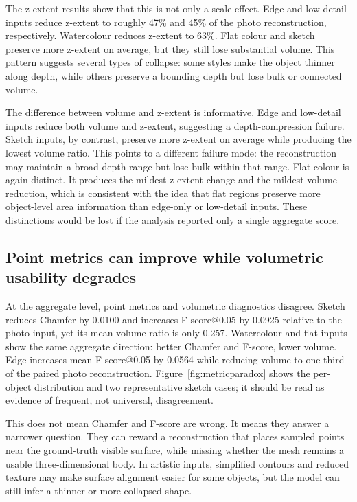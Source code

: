 \documentclass[12pt,a4paper]{article}
\begin{document}
The z-extent results show that this is not only a scale effect. Edge and low-detail inputs reduce z-extent to roughly 47\% and 45\% of the photo reconstruction, respectively. Watercolour reduces z-extent to 63\%. Flat colour and sketch preserve more z-extent on average, but they still lose substantial volume. This pattern suggests several types of collapse: some styles make the object thinner along depth, while others preserve a bounding depth but lose bulk or connected volume.

The difference between volume and z-extent is informative. Edge and low-detail inputs reduce both volume and z-extent, suggesting a depth-compression failure. Sketch inputs, by contrast, preserve more z-extent on average while producing the lowest volume ratio. This points to a different failure mode: the reconstruction may maintain a broad depth range but lose bulk within that range. Flat colour is again distinct. It produces the mildest z-extent change and the mildest volume reduction, which is consistent with the idea that flat regions preserve more object-level area information than edge-only or low-detail inputs. These distinctions would be lost if the analysis reported only a single aggregate score.

\subsection{Point metrics can improve while volumetric usability degrades}

At the aggregate level, point metrics and volumetric diagnostics disagree. Sketch reduces Chamfer by 0.0100 and increases F-score@0.05 by 0.0925 relative to the photo input, yet its mean volume ratio is only 0.257. Watercolour and flat inputs show the same aggregate direction: better Chamfer and F-score, lower volume. Edge increases mean F-score@0.05 by 0.0564 while reducing volume to one third of the paired photo reconstruction. Figure~\ref{fig:metricparadox} shows the per-object distribution and two representative sketch cases; it should be read as evidence of frequent, not universal, disagreement.

This does not mean Chamfer and F-score are wrong. It means they answer a narrower question. They can reward a reconstruction that places sampled points near the ground-truth visible surface, while missing whether the mesh remains a usable three-dimensional body. In artistic inputs, simplified contours and reduced texture may make surface alignment easier for some objects, but the model can still infer a thinner or more collapsed shape.
\end{document}
